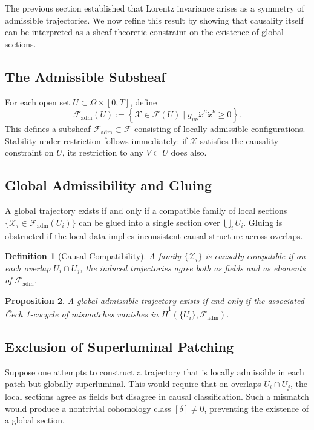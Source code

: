 \documentclass[11pt, a4paper, twocolumn]{article}
\newtheorem{definition}{Definition}[section]
\newtheorem{proposition}[definition]{Proposition}
\newcommand{\X}{\mathcal{X}}
\begin{document}
The previous section established that Lorentz invariance arises as a symmetry
of admissible trajectories. We now refine this result by showing that causality
itself can be interpreted as a sheaf-theoretic constraint on the existence of
global sections.

\subsection{The Admissible Subsheaf}

For each open set $U \subset \Omega \times [0,T]$, define
\[
    \mathcal{F}_{\mathrm{adm}}(U)
    :=
    \left\{
        \X \in \mathcal{F}(U)
        \mid
        g_{\mu\nu}\dot{x}^\mu\dot{x}^\nu \geq 0
    \right\}.
\]
This defines a subsheaf $\mathcal{F}_{\mathrm{adm}} \subset \mathcal{F}$
consisting of locally admissible configurations. Stability under restriction
follows immediately: if $\X$ satisfies the causality constraint on $U$, its
restriction to any $V \subset U$ does also.

\subsection{Global Admissibility and Gluing}

A global trajectory exists if and only if a compatible family of local sections
$\{\X_i \in \mathcal{F}_{\mathrm{adm}}(U_i)\}$ can be glued into a single
section over $\bigcup_i U_i$. Gluing is obstructed if the local data implies
inconsistent causal structure across overlaps.

\begin{definition}[Causal Compatibility]
A family $\{\X_i\}$ is causally compatible if on each overlap $U_i \cap U_j$,
the induced trajectories agree both as fields and as elements of
$\mathcal{F}_{\mathrm{adm}}$.
\end{definition}

\begin{proposition}
A global admissible trajectory exists if and only if the associated
\v{C}ech 1-cocycle of mismatches vanishes in
$\check{H}^1(\{U_i\}, \mathcal{F}_{\mathrm{adm}})$.
\end{proposition}

\subsection{Exclusion of Superluminal Patching}

Suppose one attempts to construct a trajectory that is locally admissible in
each patch but globally superluminal. This would require that on overlaps
$U_i \cap U_j$, the local sections agree as fields but disagree in causal
classification. Such a mismatch would produce a nontrivial cohomology class
$[\delta] \neq 0$, preventing the existence of a global section.
\end{document}
